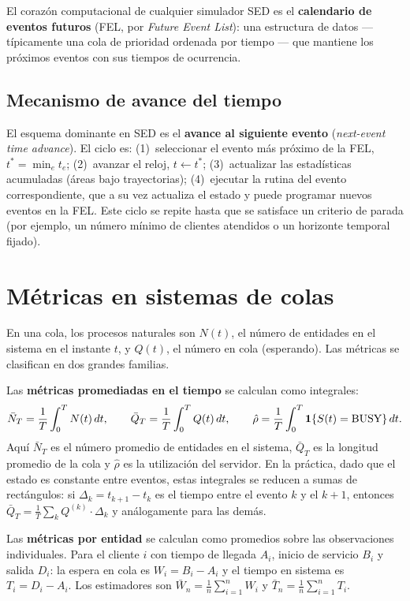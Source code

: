 \documentclass[11pt, letterpaper]{article}
\begin{document}
El corazón computacional de cualquier simulador SED es el \textbf{calendario de eventos futuros} (FEL, por \emph{Future Event List}): una estructura de datos --- típicamente una cola de prioridad ordenada por tiempo --- que mantiene los próximos eventos con sus tiempos de ocurrencia.

\subsection{Mecanismo de avance del tiempo}

El esquema dominante en SED es el \textbf{avance al siguiente evento} (\emph{next-event time advance}). El ciclo es: (1)~seleccionar el evento más próximo de la FEL, $t^* = \min_e t_e$; (2)~avanzar el reloj, $t \leftarrow t^*$; (3)~actualizar las estadísticas acumuladas (áreas bajo trayectorias); (4)~ejecutar la rutina del evento correspondiente, que a su vez actualiza el estado y puede programar nuevos eventos en la FEL. Este ciclo se repite hasta que se satisface un criterio de parada (por ejemplo, un número mínimo de clientes atendidos o un horizonte temporal fijado).


\section{Métricas en sistemas de colas}

En una cola, los procesos naturales son $N(t)$, el número de entidades en el sistema en el instante $t$, y $Q(t)$, el número en cola (esperando). Las métricas se clasifican en dos grandes familias.

Las \textbf{métricas promediadas en el tiempo} se calculan como integrales:
\[
\bar{N}_T = \frac{1}{T}\int_0^T N(t)\,dt, \qquad \bar{Q}_T = \frac{1}{T}\int_0^T Q(t)\,dt, \qquad \hat{\rho} = \frac{1}{T}\int_0^T \mathbf{1}\{S(t)=\text{BUSY}\}\,dt.
\]
Aquí $\bar{N}_T$ es el número promedio de entidades en el sistema, $\bar{Q}_T$ es la longitud promedio de la cola y $\hat{\rho}$ es la utilización del servidor. En la práctica, dado que el estado es constante entre eventos, estas integrales se reducen a sumas de rectángulos: si $\Delta_k = t_{k+1} - t_k$ es el tiempo entre el evento $k$ y el $k+1$, entonces $\bar{Q}_T = \frac{1}{T}\sum_k Q^{(k)} \cdot \Delta_k$ y análogamente para las demás.

Las \textbf{métricas por entidad} se calculan como promedios sobre las observaciones individuales. Para el cliente $i$ con tiempo de llegada $A_i$, inicio de servicio $B_i$ y salida $D_i$: la espera en cola es $W_i = B_i - A_i$ y el tiempo en sistema es $T_i = D_i - A_i$. Los estimadores son $\bar{W}_n = \frac{1}{n}\sum_{i=1}^n W_i$ y $\bar{T}_n = \frac{1}{n}\sum_{i=1}^n T_i$.
\end{document}
